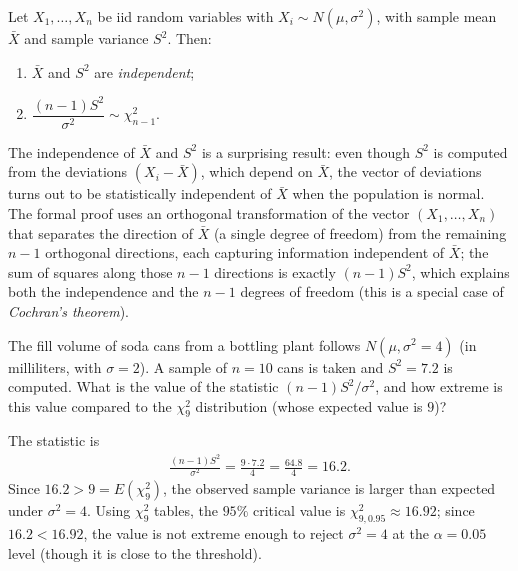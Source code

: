 \begin{teorema}
 \label{eq:5.3.2}
Let $X_1, \ldots, X_n$ be iid random variables with $X_i \sim N(\mu, \sigma^2)$, with sample mean $\bar{X}$ and sample variance $S^2$. Then:
\begin{enumerate}
 \item $\bar{X}$ and $S^2$ are \emph{independent};
 \item $\dfrac{(n-1)S^2}{\sigma^2} \sim \chi^2_{n-1}$.
\end{enumerate}
\end{teorema}

\begin{observacion}
The independence of $\bar{X}$ and $S^2$ is a surprising result: even though $S^2$ is computed from the deviations $(X_i-\bar{X})$, which depend on $\bar{X}$, the vector of deviations turns out to be statistically independent of $\bar{X}$ when the population is normal. The formal proof uses an orthogonal transformation of the vector $(X_1,\ldots,X_n)$ that separates the direction of $\bar{X}$ (a single degree of freedom) from the remaining $n-1$ orthogonal directions, each capturing information independent of $\bar X$; the sum of squares along those $n-1$ directions is exactly $(n-1)S^2$, which explains both the independence and the $n-1$ degrees of freedom (this is a special case of \emph{Cochran's theorem}).
\end{observacion}

\begin{ejemplo}
 \label{exmp:5.3.1}
The fill volume of soda cans from a bottling plant follows $N(\mu, \sigma^2=4)$ (in milliliters, with $\sigma=2$). A sample of $n=10$ cans is taken and $S^2 = 7.2$ is computed. What is the value of the statistic $(n-1)S^2/\sigma^2$, and how extreme is this value compared to the $\chi^2_9$ distribution (whose expected value is $9$)?
\end{ejemplo}

\begin{solucion}
The statistic is
\begin{align}
 \frac{(n-1)S^2}{\sigma^2} = \frac{9 \cdot 7.2}{4} = \frac{64.8}{4} = 16.2.
\end{align}
Since $16.2 > 9 = E(\chi^2_9)$, the observed sample variance is larger than expected under $\sigma^2=4$. Using $\chi^2_9$ tables, the $95\%$ critical value is $\chi^2_{9,0.95} \approx 16.92$; since $16.2 < 16.92$, the value is not extreme enough to reject $\sigma^2=4$ at the $\alpha=0.05$ level (though it is close to the threshold).
\end{solucion}
